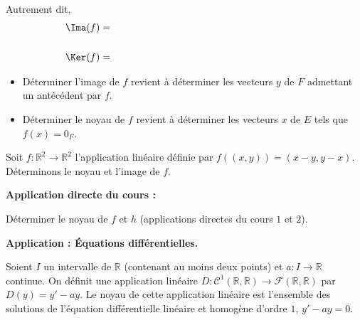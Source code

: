 \documentclass[french,11pt,twoside]{VcCours}
\newenvironment{ApplicationDirecte}{\textbf{Application directe du cours :}

}{}
\begin{document}
 Autrement dit,
 \begin{align*}
	\Ima(f)&= \phantom{\lbrace f(x) \, \vert \, x \in E \rbrace = \lbrace y \in F \, \vert \, \exists x \in E, \, y=f(x) \rbrace}\\\\
	\Ker(f)&= \phantom{ bla bl a\lbrace x \in E \, \vert \,  f(x)= 0_F \rbrace}
 \end{align*}

\newpage

 \begin{Remarques}{}
\begin{itemize} 
 \item Déterminer l'image de $f$ revient à déterminer les vecteurs $y$ de $F$ admettant un antécédent par $f$.
 \item Déterminer le noyau de $f$ revient à déterminer les vecteurs $x$ de $E$ tels que $f(x)= 0_F$.
 \end{itemize}
\end{Remarques}{}
 
\begin{Exemple}
	Soit $f : \mathbb{R}^2 \rightarrow \mathbb{R}^2$ l'application linéaire définie par $f((x,y))=(x-y,y-x)$. Déterminons le noyau et l'image de $f$.
 
% 

\vspace{7cm}
\end{Exemple}

\begin{ApplicationDirecte} 
	Déterminer le noyau de $f$ et $h$ (applications directes du cours $1$ et $2$).
\end{ApplicationDirecte}

\medskip
\textbf{Application : Équations différentielles.}

Soient $I$ un intervalle de $\mathbb{R}$ (contenant au moins deux points) et $a : I \rightarrow \mathbb{R}$ continue. On définit une application linéaire $D : \mathcal{C}^1(\mathbb{R}, \mathbb{R}) \rightarrow \mathcal{F}(\mathbb{R}, \mathbb{R})$ par $D(y)=y'-ay$. Le noyau de cette application linéaire est l'ensemble des solutions de l'équation différentielle linéaire et homogène d'ordre $1$, $y'-ay=0$.
\end{document}
